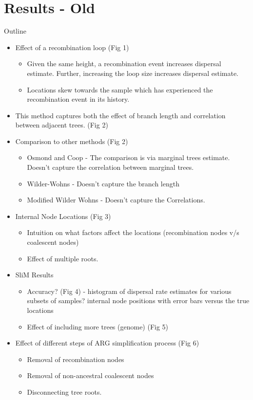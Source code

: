 \section{Results - Old}

Outline 
\begin{itemize}
    \item Effect of a recombination loop (Fig 1)
    
    \begin{itemize}
        \item Given the same height, a recombination event increases dispersal estimate. Further, increasing the loop size increases dispersal estimate.
        \item Locations skew towards the sample which has experienced the recombination event in its history.
    \end{itemize}
    \item This method captures both the effect of branch length and correlation between adjacent trees. (Fig 2)
    \item Comparison to other methods (Fig 2)  
    \begin{itemize}
        \item Osmond and Coop - The comparison is via marginal trees estimate. Doesn't capture the correlation between marginal trees.
        \item Wilder-Wohns - Doesn't capture the branch length
        \item Modified Wilder Wohns - Doesn't capture the Correlations. 
    \end{itemize}
    \item Internal Node Locations (Fig 3)
    \begin{itemize}
        \item Intuition on what factors affect the locations (recombination nodes v/s coalescent nodes) 
        \item Effect of multiple roots. 
    \end{itemize}

    \item SliM Results
    \begin{itemize}
        \item Accuracy?  (Fig 4) - histogram of dispersal rate estimates for various subsets of samples? internal node positions with error bars versus the true locations
        \item Effect of including more trees (genome) (Fig 5) 
    \end{itemize}

    \item Effect of different steps of ARG simplification process (Fig 6) 
    \begin{itemize}
        \item Removal of recombination nodes 
        \item Removal of non-ancestral coalescent nodes 
        \item Disconnecting tree roots. 
    \end{itemize}
\end{itemize}


